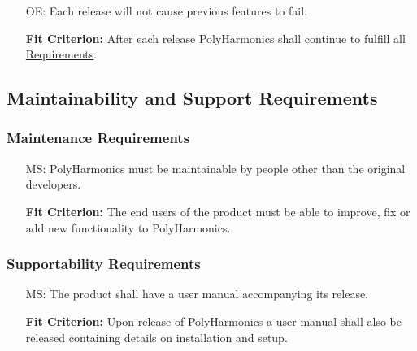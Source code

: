 \documentclass[12pt]{article}
\newcounter{oaenum}
\newcounter{masnum}
\newcommand{\progname}{PolyHarmonics}
\begin{document}
\noindent \begin{itemize}


\item[OE\refstepcounter{oaenum}\theoaenum\label{NF_RP2}:] Each release will not
  cause previous features to fail.

  \textbf{Fit Criterion:} After each release \progname{} shall continue to
   fulfill all \newline \hyperref[Func]{Requirements}.

\end{itemize}

\subsection{Maintainability and Support Requirements}

\subsubsection{Maintenance Requirements}

\noindent \begin{itemize}
\item[MS\refstepcounter{masnum}\themasnum\label{NF_mas1}:] \progname{} must be
  maintainable by people other than the original developers.

  \textbf{Fit Criterion:} The end users of the product must be able to improve,
  fix or add new functionality to \progname{}.

\end{itemize}

\subsubsection{Supportability Requirements}

\noindent \begin{itemize}
\item[MS\refstepcounter{masnum}\themasnum\label{NF_SR1}:] The product shall have
  a user manual accompanying its release.

  \textbf{Fit Criterion:} Upon release of \progname{} a user manual shall also
  be released containing details on installation and setup.
\end{itemize}
\end{document}
